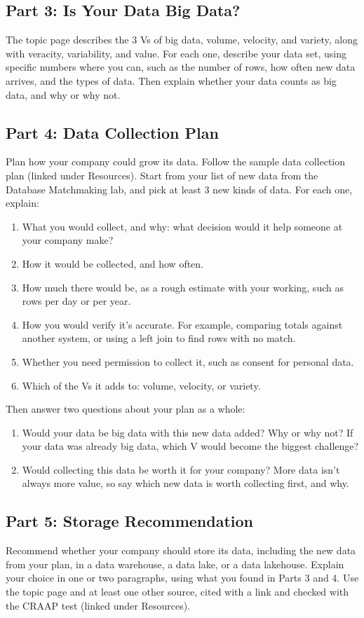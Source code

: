 \documentclass[12pt]{article}
\begin{document}
\subsection*{Part 3: Is Your Data Big Data?}
The topic page describes the 3 Vs of big data, volume, velocity, and variety, along with veracity, variability, and value. For each one, describe your data set, using specific numbers where you can, such as the number of rows, how often new data arrives, and the types of data. Then explain whether your data counts as big data, and why or why not.

\subsection*{Part 4: Data Collection Plan}
Plan how your company could grow its data. Follow the sample data collection plan (linked under Resources). Start from your list of new data from the Database Matchmaking lab, and pick at least 3 new kinds of data. For each one, explain:
\begin{enumerate}
    \item What you would collect, and why: what decision would it help someone at your company make?
    \item How it would be collected, and how often.
    \item How much there would be, as a rough estimate with your working, such as rows per day or per year.
    \item How you would verify it's accurate. For example, comparing totals against another system, or using a left join to find rows with no match.
    \item Whether you need permission to collect it, such as consent for personal data.
    \item Which of the Vs it adds to: volume, velocity, or variety.
\end{enumerate}
Then answer two questions about your plan as a whole:
\begin{enumerate}
    \item Would your data be big data with this new data added? Why or why not? If your data was already big data, which V would become the biggest challenge?
    \item Would collecting this data be worth it for your company? More data isn't always more value, so say which new data is worth collecting first, and why.
\end{enumerate}

\subsection*{Part 5: Storage Recommendation}
Recommend whether your company should store its data, including the new data from your plan, in a data warehouse, a data lake, or a data lakehouse. Explain your choice in one or two paragraphs, using what you found in Parts 3 and 4. Use the topic page and at least one other source, cited with a link and checked with the CRAAP test (linked under Resources).
\end{document}
